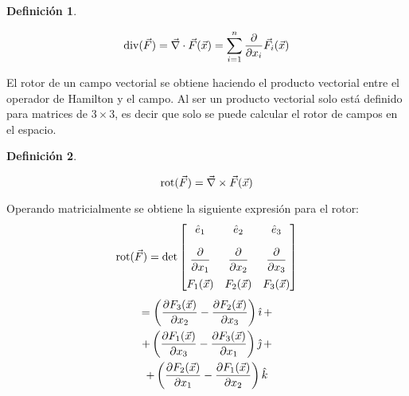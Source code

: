 \documentclass[a5paper,12pt,twoside]{book}
\newtheorem{defn}{{Definición}}[chapter]
\begin{document}
\begin{mdframed}[style=DefinitionFrame]
    \begin{defn}
    \end{defn}
    \begin{equation*}
        \operatorname{div}(\Vec{F}) = \Vec{\nabla} \cdot \Vec{F}(\Vec{x}) = \sum_{i=1}^n \dfrac{\partial}{\partial x_i} \Vec{F}_i(\Vec{x})
    \end{equation*}
\end{mdframed}

El rotor de un campo vectorial se obtiene haciendo el producto vectorial entre el operador de Hamilton y el campo.
Al ser un producto vectorial solo está definido para matrices de $3 \times 3$, es decir que solo se puede calcular el rotor de campos en el espacio.

\begin{mdframed}[style=DefinitionFrame]
    \begin{defn}
    \end{defn}
    \begin{equation*}
        \operatorname{rot} (\Vec{F}) = \Vec{\nabla} \times \Vec{F}(\Vec{x})
    \end{equation*}
\end{mdframed}

Operando matricialmente se obtiene la siguiente expresión para el rotor:
\begin{equation*}
    \operatorname{rot} (\Vec{F}) = \operatorname{det}
    \begin{bmatrix}
        \hat{e}_1 & \hat{e}_2 & \hat{e}_3 \\[1em]
        \dfrac{\partial}{\partial x_1} & \dfrac{\partial}{\partial x_2} & \dfrac{\partial}{\partial x_3} \\[1em]
        F_1(\Vec{x}) & F_2(\Vec{x}) & F_3(\Vec{x})
    \end{bmatrix}
\end{equation*}
\begin{multline*}
    = \left( \dfrac{\partial F_3(\Vec{x})}{\partial x_2} - \dfrac{\partial F_2(\Vec{x})}{\partial x_3} \right) \hat{\imath} \, +
    \\
    + \left( \dfrac{\partial F_1(\Vec{x})}{\partial x_3} - \dfrac{\partial F_3(\Vec{x})}{\partial x_1} \right) \hat{\jmath} \, +
    \\ + \left( \dfrac{\partial F_2(\Vec{x})}{\partial x_1} - \dfrac{\partial F_1(\Vec{x})}{\partial x_2} \right) \hat{k}
\end{multline*}
\end{document}
